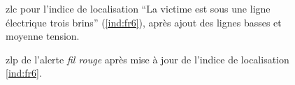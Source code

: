 \begin{figure}
  \centering
  
  \caption{\ac{zlc} pour l'indice de localisation \enquote{La victime
      est sous une ligne électrique trois brins} (\ref{ind:fr6}),
    après ajout des lignes basses et moyenne tension.}
  \label{fig:ZLC_FilRouge_6_2}
\end{figure}


\begin{figure}
  \centering
  
  \caption{\ac{zlp} de l'alerte \emph{fil rouge} après mise à jour de
    l'indice de localisation \ref{ind:fr6}.}
  \label{fig:zlp_fil_rouge_2}
\end{figure}

